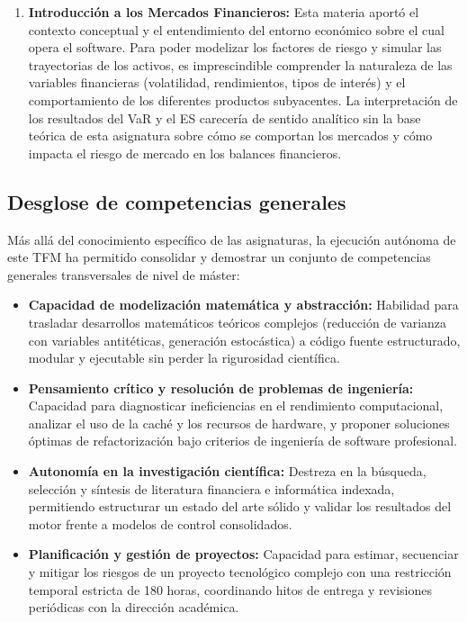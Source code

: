 \documentclass[11pt]{article}
\begin{document}
\begin{enumerate}
    \item \textbf{Introducción a los Mercados Financieros:}
    Esta materia aportó el contexto conceptual y el entendimiento del entorno económico sobre el cual opera el software. Para poder modelizar los factores de riesgo y simular las trayectorias de los activos, es imprescindible comprender la naturaleza de las variables financieras (volatilidad, rendimientos, tipos de interés) y el comportamiento de los diferentes productos subyacentes. La interpretación de los resultados del VaR y el ES carecería de sentido analítico sin la base teórica de esta asignatura sobre cómo se comportan los mercados y cómo impacta el riesgo de mercado en los balances financieros.
\end{enumerate}

\subsection{Desglose de competencias generales}

Más allá del conocimiento específico de las asignaturas, la ejecución autónoma de este TFM ha permitido consolidar y demostrar un conjunto de competencias generales transversales de nivel de máster:

\begin{itemize}
    \item \textbf{Capacidad de modelización matemática y abstracción:} Habilidad para trasladar desarrollos matemáticos teóricos complejos (reducción de varianza con variables antitéticas, generación estocástica) a código fuente estructurado, modular y ejecutable sin perder la rigurosidad científica.
    \item \textbf{Pensamiento crítico y resolución de problemas de ingeniería:} Capacidad para diagnosticar ineficiencias en el rendimiento computacional, analizar el uso de la caché y los recursos de hardware, y proponer soluciones óptimas de refactorización bajo criterios de ingeniería de software profesional.
    \item \textbf{Autonomía en la investigación científica:} Destreza en la búsqueda, selección y síntesis de literatura financiera e informática indexada, permitiendo estructurar un estado del arte sólido y validar los resultados del motor frente a modelos de control consolidados.
    \item \textbf{Planificación y gestión de proyectos:} Capacidad para estimar, secuenciar y mitigar los riesgos de un proyecto tecnológico complejo con una restricción temporal estricta de 180 horas, coordinando hitos de entrega y revisiones periódicas con la dirección académica.
\end{itemize}
\end{document}
